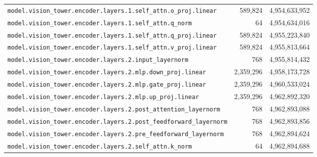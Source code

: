 \documentclass[10pt,a4paper]{article}
\theoremstyle{definition}
\begin{document}
\begin{appendices}
\begin{longtable}{p{9.5cm}rr}
\texttt{model.\allowbreak{}vision\_tower.\allowbreak{}encoder.\allowbreak{}layers.\allowbreak{}1.\allowbreak{}self\_attn.\allowbreak{}o\_proj.\allowbreak{}linear} & 589,824 & 4,954,633,952 \\
\texttt{model.\allowbreak{}vision\_tower.\allowbreak{}encoder.\allowbreak{}layers.\allowbreak{}1.\allowbreak{}self\_attn.\allowbreak{}q\_norm} & 64 & 4,954,634,016 \\
\texttt{model.\allowbreak{}vision\_tower.\allowbreak{}encoder.\allowbreak{}layers.\allowbreak{}1.\allowbreak{}self\_attn.\allowbreak{}q\_proj.\allowbreak{}linear} & 589,824 & 4,955,223,840 \\
\texttt{model.\allowbreak{}vision\_tower.\allowbreak{}encoder.\allowbreak{}layers.\allowbreak{}1.\allowbreak{}self\_attn.\allowbreak{}v\_proj.\allowbreak{}linear} & 589,824 & 4,955,813,664 \\
\texttt{model.\allowbreak{}vision\_tower.\allowbreak{}encoder.\allowbreak{}layers.\allowbreak{}2.\allowbreak{}input\_layernorm} & 768 & 4,955,814,432 \\
\texttt{model.\allowbreak{}vision\_tower.\allowbreak{}encoder.\allowbreak{}layers.\allowbreak{}2.\allowbreak{}mlp.\allowbreak{}down\_proj.\allowbreak{}linear} & 2,359,296 & 4,958,173,728 \\
\texttt{model.\allowbreak{}vision\_tower.\allowbreak{}encoder.\allowbreak{}layers.\allowbreak{}2.\allowbreak{}mlp.\allowbreak{}gate\_proj.\allowbreak{}linear} & 2,359,296 & 4,960,533,024 \\
\texttt{model.\allowbreak{}vision\_tower.\allowbreak{}encoder.\allowbreak{}layers.\allowbreak{}2.\allowbreak{}mlp.\allowbreak{}up\_proj.\allowbreak{}linear} & 2,359,296 & 4,962,892,320 \\
\texttt{model.\allowbreak{}vision\_tower.\allowbreak{}encoder.\allowbreak{}layers.\allowbreak{}2.\allowbreak{}post\_attention\_layernorm} & 768 & 4,962,893,088 \\
\texttt{model.\allowbreak{}vision\_tower.\allowbreak{}encoder.\allowbreak{}layers.\allowbreak{}2.\allowbreak{}post\_feedforward\_layernorm} & 768 & 4,962,893,856 \\
\texttt{model.\allowbreak{}vision\_tower.\allowbreak{}encoder.\allowbreak{}layers.\allowbreak{}2.\allowbreak{}pre\_feedforward\_layernorm} & 768 & 4,962,894,624 \\
\texttt{model.\allowbreak{}vision\_tower.\allowbreak{}encoder.\allowbreak{}layers.\allowbreak{}2.\allowbreak{}self\_attn.\allowbreak{}k\_norm} & 64 & 4,962,894,688 \\

\end{longtable}
\end{appendices}
\end{document}
